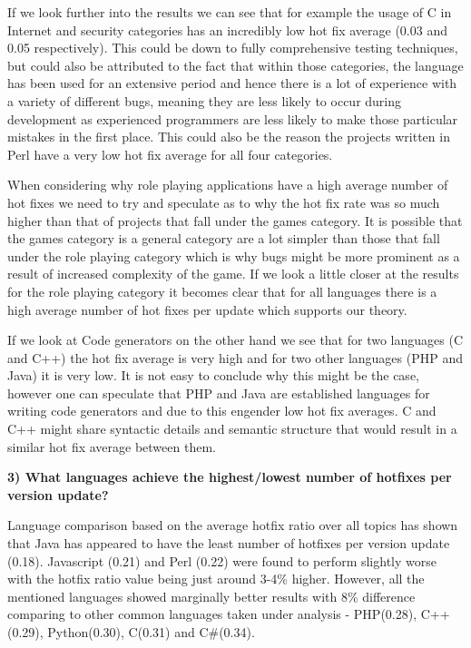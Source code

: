 If we look further into the results we can see that for example the usage of C in Internet and security categories has an incredibly low hot fix average (0.03 and 0.05 respectively). This could be down to fully comprehensive testing techniques, but could also be attributed to the fact that within those categories, the language has been used for an extensive period and hence there is a lot of experience with a variety of different bugs, meaning they are less likely to occur during development as experienced programmers are less likely to make those particular mistakes in the first place. This could also be the reason the projects written in Perl have a very low hot fix average for all four categories.

When considering why role playing applications have a high average number of hot fixes we need to try and speculate as to why the hot fix rate was so much higher than that of projects that fall under the games category. It is possible that the games category is a general category are a lot simpler than those that fall under the role playing category which is why bugs might be more prominent as a result of increased complexity of the game. If we look a little closer at the results for the role playing category it becomes clear that for all languages there is a high average number of hot fixes per update which supports our theory.

If we look at Code generators on the other hand we see that for two languages (C and C++) the hot fix average is very high and for two other languages (PHP and Java) it is very low. It is not easy to conclude why this might be the case, however one can speculate that PHP and Java are established languages for writing code generators and due to this engender low hot fix averages. C and C++ might share syntactic details and semantic structure that would result in a similar hot fix average between them.

\textbf{3) What languages achieve the highest/lowest number of hotfixes per version update?}

Language comparison based on the average hotfix ratio over all topics has shown that Java has appeared to have the least number of hotfixes per version update (0.18). Javascript (0.21) and Perl (0.22) were found to perform slightly worse with the hotfix ratio value being just around 3-4\% higher. However, all the mentioned languages showed marginally better results with 8\% difference comparing to other common languages taken under analysis - PHP(0.28), C++(0.29), Python(0.30), C(0.31) and C\#(0.34). 

